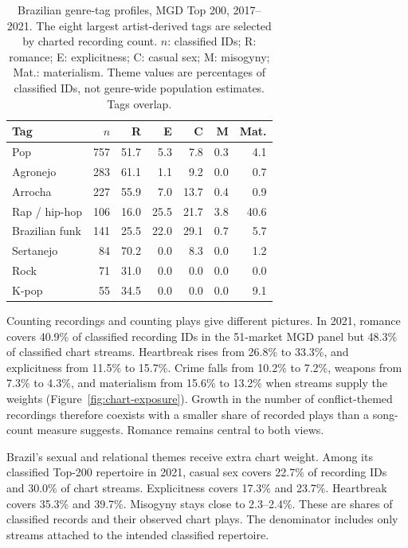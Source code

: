 \documentclass[10pt,a4paper,twocolumn]{article}
\begin{document}
\begin{table}[t]
\caption{Brazilian genre-tag profiles, MGD Top 200, 2017--2021. The eight largest artist-derived tags are selected by charted recording count. $n$: classified IDs; R: romance; E: explicitness; C: casual sex; M: misogyny; Mat.: materialism. Theme values are percentages of classified IDs, not genre-wide population estimates. Tags overlap.}
\label{tab:genre-profiles}
\centering\scriptsize\setlength{\tabcolsep}{2.8pt}
\begin{tabular}{@{}lrrrrrr@{}}\toprule Tag & $n$ & R & E & C & M & Mat.\\\midrule
Pop & 757 & 51.7 & 5.3 & 7.8 & 0.3 & 4.1 \\
Agronejo & 283 & 61.1 & 1.1 & 9.2 & 0.0 & 0.7 \\
Arrocha & 227 & 55.9 & 7.0 & 13.7 & 0.4 & 0.9 \\
Rap / hip-hop & 106 & 16.0 & 25.5 & 21.7 & 3.8 & 40.6 \\
Brazilian funk & 141 & 25.5 & 22.0 & 29.1 & 0.7 & 5.7 \\
Sertanejo & 84 & 70.2 & 0.0 & 8.3 & 0.0 & 1.2 \\
Rock & 71 & 31.0 & 0.0 & 0.0 & 0.0 & 0.0 \\
K-pop & 55 & 34.5 & 0.0 & 0.0 & 0.0 & 9.1 \\
\bottomrule\end{tabular}
\end{table}

Counting recordings and counting plays give different pictures. In 2021, romance covers 40.9\% of classified recording IDs in the 51-market MGD panel but 48.3\% of classified chart streams. Heartbreak rises from 26.8\% to 33.3\%, and explicitness from 11.5\% to 15.7\%. Crime falls from 10.2\% to 7.2\%, weapons from 7.3\% to 4.3\%, and materialism from 15.6\% to 13.2\% when streams supply the weights (Figure~\ref{fig:chart-exposure}). Growth in the number of conflict-themed recordings therefore coexists with a smaller share of recorded plays than a song-count measure suggests. Romance remains central to both views.

Brazil's sexual and relational themes receive extra chart weight. Among its classified Top-200 repertoire in 2021, casual sex covers 22.7\% of recording IDs and 30.0\% of chart streams. Explicitness covers 17.3\% and 23.7\%. Heartbreak covers 35.3\% and 39.7\%. Misogyny stays close to 2.3--2.4\%. These are shares of classified records and their observed chart plays. The denominator includes only streams attached to the intended classified repertoire.
\end{document}
